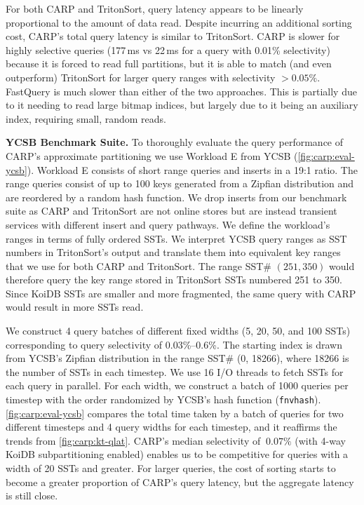 For both CARP and TritonSort, query latency appears to be linearly proportional to the amount of
data read.
Despite incurring an additional sorting cost, CARP's total query latency is similar to TritonSort.
CARP is slower for highly selective queries (177\,ms vs 22\,ms for a query with 0.01\% selectivity)
because it is forced to read full partitions, but it is able to match (and even outperform)
TritonSort for larger query ranges with selectivity $> 0.05\%$.
FastQuery is much slower than either of the two approaches.
This is partially due to it needing to read large bitmap indices, but largely due to it being an
auxiliary index, requiring small, random reads.


\vspace{5pt}
\vspace{5pt}

\textbf{YCSB Benchmark Suite.
}
To thoroughly evaluate the query performance of CARP's approximate partitioning we use Workload E
from YCSB (\cref{fig:carp:eval-ycsb}).
Workload E consists of short range queries and inserts in a 19:1 ratio.
The range queries consist of up to 100 keys generated from a Zipfian distribution and are reordered
by a random hash function.
We drop inserts from our benchmark suite as CARP and TritonSort are not online stores but are
instead transient services with different insert and query pathways.
We define the workload's ranges in terms of fully ordered SSTs.
We interpret YCSB query ranges as SST numbers in TritonSort's output and translate them into
equivalent key ranges that we use for both CARP and TritonSort.
The range SST\# $(251, 350)$ would therefore query the key range stored in TritonSort SSTs numbered
251 to 350.
Since KoiDB SSTs are smaller and more fragmented, the same query with CARP would result in more
SSTs read.

\figevalycsb

We construct 4 query batches of different fixed widths (5, 20, 50, and 100 SSTs) corresponding to
query selectivity of 0.03\%--0.6\%.
The starting index is drawn from YCSB's Zipfian distribution in the range SST\# (0, 18266), where
18266 is the number of SSTs in each timestep.
We use 16 I/O threads to fetch SSTs for each query in parallel.
For each width, we construct a batch of 1000 queries per timestep with the order randomized by
YCSB's hash function (\texttt{fnvhash}).
\cref{fig:carp:eval-ycsb} compares the total time taken by a batch of queries for two different
timesteps and 4 query widths for each timestep, and it reaffirms the trends from
\cref{fig:carp:kt-qlat}.
CARP's median selectivity of $~0.07\%$ (with 4-way KoiDB subpartitioning enabled) enables us to be
competitive for queries with a width of 20 SSTs and greater.
For larger queries, the cost of sorting starts to become a greater proportion of CARP's query
latency, but the aggregate latency is still close.

